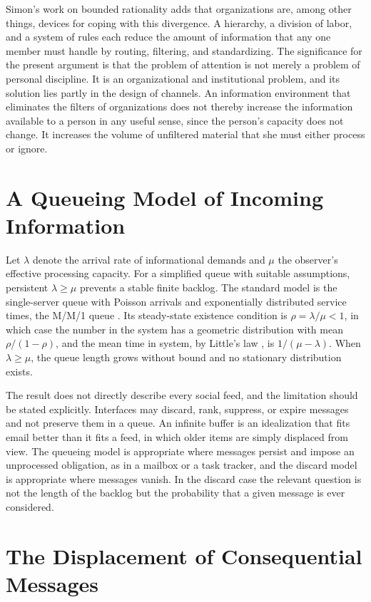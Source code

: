 \documentclass[11pt]{report}
\theoremstyle{definition}
\theoremstyle{remark}
\begin{document}
Simon's work on bounded rationality \cite{marchsimon} adds that organizations are, among other things, devices for coping with this divergence. A hierarchy, a division of labor, and a system of rules each reduce the amount of information that any one member must handle by routing, filtering, and standardizing. The significance for the present argument is that the problem of attention is not merely a problem of personal discipline. It is an organizational and institutional problem, and its solution lies partly in the design of channels. An information environment that eliminates the filters of organizations does not thereby increase the information available to a person in any useful sense, since the person's capacity does not change. It increases the volume of unfiltered material that she must either process or ignore.

\section{A Queueing Model of Incoming Information}

Let $\lambda$ denote the arrival rate of informational demands and $\mu$ the observer's effective processing capacity. For a simplified queue with suitable assumptions, persistent $\lambda\ge\mu$ prevents a stable finite backlog. The standard model is the single-server queue with Poisson arrivals and exponentially distributed service times, the M/M/1 queue \cite{kleinrock}. Its steady-state existence condition is $\rho=\lambda/\mu<1$, in which case the number in the system has a geometric distribution with mean $\rho/(1-\rho)$, and the mean time in system, by Little's law \cite{little}, is $1/(\mu-\lambda)$. When $\lambda\ge\mu$, the queue length grows without bound and no stationary distribution exists.

The result does not directly describe every social feed, and the limitation should be stated explicitly. Interfaces may discard, rank, suppress, or expire messages and not preserve them in a queue. An infinite buffer is an idealization that fits email better than it fits a feed, in which older items are simply displaced from view. The queueing model is appropriate where messages persist and impose an unprocessed obligation, as in a mailbox or a task tracker, and the discard model is appropriate where messages vanish. In the discard case the relevant question is not the length of the backlog but the probability that a given message is ever considered.

\section{The Displacement of Consequential Messages}
\end{document}
